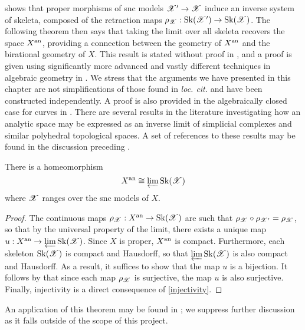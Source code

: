 shows that proper morphisms of snc models $\mathscr{X}' \to \mathscr{X}$ induce an inverse system of skeleta, composed of the retraction maps $\rho_{\mathscr{X}}: \operatorname{Sk}(\mathscr{X}') \to \operatorname{Sk}(\mathscr{X})$.
The following theorem then says that taking the limit over all skeleta recovers the space $X^{\text{an}}$, providing a connection between the geometry of $X^{\text{an}}$ and the birational geometry of $X$.
This result is stated without proof in \parencite[p. 77, Theorem 10]{kontsevich}, and a proof is given using significantly more advanced and vastly different techniques in algebraic geometry in \parencite[Corollary 3.2]{bfj}.
We stress that the arguments we have presented in this chapter are not simplifications of those found in \textit{loc. cit.} and have been constructed independently.
A proof is also provided in the algebraically closed case for curves in \parencite[Theorem 5.2]{bpr}.
There are several results in the literature investigating how an analytic space may be expressed as an inverse limit of simplicial complexes and similar polyhedral topological spaces.
A set of references to these results may be found in the discussion preceding \parencite[Corollary 3.2]{bfj}.

\begin{theorem}\label{thm:homeomorphism}
    There is a homeomorphism
    \[
        X^{\text{an}} \cong \varprojlim \operatorname{Sk}(\mathscr{X})
    \]
    where $\mathscr{X}$ ranges over the snc models of $X$.
\end{theorem}

\begin{proof}
    The continuous maps $\rho_{\mathscr{X}}: X^{\text{an}} \to \operatorname{Sk}(\mathscr{X})$ are such that $\rho_{\mathscr{X}} \circ \rho_{\mathscr{X}'} = \rho_{\mathscr{X}}$, so that by the universal property of the limit, there exists a unique map $u: X^{\text{an}} \to \varprojlim \operatorname{Sk}(\mathscr{X})$.
    Since $X$ is proper, $X^{\text{an}}$ is compact. 
    Furthermore, each skeleton $\operatorname{Sk}(\mathscr{X})$ is compact and Hausdorff, so that $\varprojlim \operatorname{Sk}(\mathscr{X})$ is also compact and Hausdorff.
    As a result, it suffices to show that the map $u$ is a bijection.
    It follows by \parencite[\S 9.6, Cor. 2]{bourbaki} that since each map $\rho_{\mathscr{X}}$ is surjective, the map $u$ is also surjective.
    Finally, injectivity is a direct consequence of \cref{injectivity}.
\end{proof}

An application of this theorem may be found in \parencite{bfj}; we suppress further discussion as it falls outside of the scope of this project.
